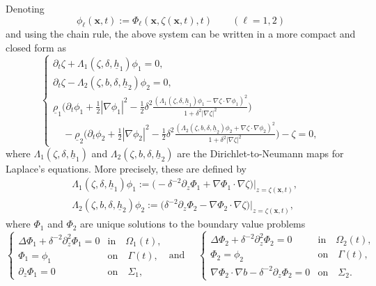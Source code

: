 \documentclass[11pt,leqno]{article}
\numberwithin{equation}{section}
\numberwithin{figure}{section}
\begin{document}
%
Denoting
%
\[
\phi_\ell(\bm{x},t):=\Phi_\ell(\bm{x},\zeta(\bm{x},t),t) \qquad (\ell=1,2)
\]
%
and using the chain rule, the above system can be written in a more compact and closed form as 
%
\begin{equation}\label{full-model-evolution}
\begin{cases}
\partial_t\zeta + \Lambda_1(\zeta,\delta,\underline{h}_1)\phi_1=0,\\
\partial_t\zeta - \Lambda_2(\zeta,b,\delta,\underline{h}_2)\phi_2 =0,\\
\displaystyle
\underline{\rho}_1\biggl( \partial_t\phi_1 + \frac12|\nabla\phi_1|^2
 - \frac12\delta^2 \frac{(\Lambda_1(\zeta,\delta,\underline{h}_1)\phi_1
  - \nabla\zeta \cdot \nabla\phi_1 )^2}{1+\delta^2|\nabla\zeta|^2} \biggr) \\
\displaystyle\quad
 - \underline{\rho}_2\biggl( \partial_t\phi_2 + \frac12|\nabla\phi_2|^2
  - \frac12\delta^2 \frac{(\Lambda_2(\zeta,b,\delta,\underline{h}_2)\phi_2
   + \nabla\zeta \cdot \nabla\phi_2 )^2}{1+\delta^2|\nabla\zeta|^2} \biggr)
 - \zeta = 0,
\end{cases}
\end{equation}
%
where $\Lambda_1(\zeta,\delta,\underline{h}_1)$ and $\Lambda_2(\zeta,b,\delta,\underline{h}_2)$ 
are the Dirichlet-to-Neumann maps for Laplace's equations. 
More precisely, these are defined by 
%
\begin{align*}
&\Lambda_1(\zeta,\delta,\underline{h}_1)\phi_1
 := \bigl( -\delta^{-2}\partial_z\Phi_1+\nabla\Phi_1 \cdot \nabla\zeta \bigr)\bigr\vert_{z=\zeta(\bm{x},t)}, \\
&\Lambda_2(\zeta,b,\delta,\underline{h}_2)\phi_2
 := \bigl( \delta^{-2}\partial_z\Phi_2-\nabla\Phi_2 \cdot \nabla\zeta \bigr)\bigr\vert_{z=\zeta(\bm{x},t)},
\end{align*}
%
where $\Phi_1$ and $\Phi_2$ are unique solutions to the boundary value problems 
%
\[
\begin{cases}
 \Delta\Phi_1 + \delta^{-2}\partial_z^2\Phi_1 = 0 & \mbox{in}\quad \Omega_1(t), \\
 \Phi_1=\phi_1& \mbox{on}\quad \Gamma(t), \\
 \partial_z\Phi_1 = 0 & \mbox{on}\quad \Sigma_1, 
\end{cases}
%
\text{ and } \quad
%
\begin{cases}
\Delta\Phi_2 + \delta^{-2}\partial_z^2\Phi_2 = 0 & \mbox{in}\quad \Omega_2(t), \\
\Phi_2=\phi_2& \mbox{on}\quad \Gamma(t), \\
\nabla\Phi_2 \cdot \nabla b - \delta^{-2}\partial_z\Phi_2 = 0
 & \mbox{on}\quad \Sigma_2.
\end{cases}
\]
\end{document}
